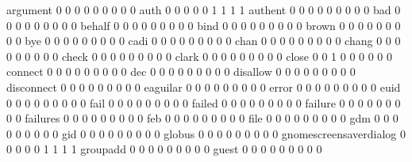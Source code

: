\documentclass[compress,8pt]{beamer}
\begin{document}
\begin{frame}
\begin{Schunk}
  argument                                   0   0   0   0   0   0   0   0   0
  auth                                       0   0   0   0   0   1   1   1   1
  authent                                    0   0   0   0   0   0   0   0   0
  bad                                        0   0   0   0   0   0   0   0   0
  behalf                                     0   0   0   0   0   0   0   0   0
  bind                                       0   0   0   0   0   0   0   0   0
  brown                                      0   0   0   0   0   0   0   0   0
  bye                                        0   0   0   0   0   0   0   0   0
  cadi                                       0   0   0   0   0   0   0   0   0
  chan                                       0   0   0   0   0   0   0   0   0
  chang                                      0   0   0   0   0   0   0   0   0
  check                                      0   0   0   0   0   0   0   0   0
  clark                                      0   0   0   0   0   0   0   0   0
  close                                      0   0   1   0   0   0   0   0   0
  connect                                    0   0   0   0   0   0   0   0   0
  dec                                        0   0   0   0   0   0   0   0   0
  disallow                                   0   0   0   0   0   0   0   0   0
  disconnect                                 0   0   0   0   0   0   0   0   0
  eaguilar                                   0   0   0   0   0   0   0   0   0
  error                                      0   0   0   0   0   0   0   0   0
  euid                                       0   0   0   0   0   0   0   0   0
  fail                                       0   0   0   0   0   0   0   0   0
  failed                                     0   0   0   0   0   0   0   0   0
  failure                                    0   0   0   0   0   0   0   0   0
  failures                                   0   0   0   0   0   0   0   0   0
  feb                                        0   0   0   0   0   0   0   0   0
  file                                       0   0   0   0   0   0   0   0   0
  gdm                                        0   0   0   0   0   0   0   0   0
  gid                                        0   0   0   0   0   0   0   0   0
  globus                                     0   0   0   0   0   0   0   0   0
  gnomescreensaverdialog                     0   0   0   0   0   1   1   1   1
  groupadd                                   0   0   0   0   0   0   0   0   0
  guest                                      0   0   0   0   0   0   0   0   0

\end{Schunk}
\end{frame}
\end{document}
